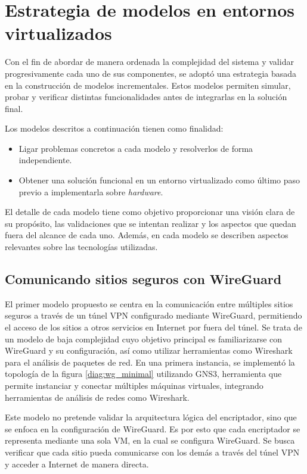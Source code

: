 \chapter{Estrategia de modelos en entornos virtualizados}

Con el fin de abordar de manera ordenada la complejidad del sistema y validar progresivamente cada uno de sus componentes, se adoptó una estrategia basada en la construcción de modelos incrementales. Estos modelos permiten simular, probar y verificar distintas funcionalidades antes de integrarlas en la solución final.

Los modelos descritos a continuación tienen como finalidad:
\begin{itemize}
    \item Ligar problemas concretos a cada modelo y resolverlos de forma independiente. %
    \item Obtener una solución funcional en un entorno virtualizado como último paso previo a implementarla sobre \textit{hardware}.
\end{itemize}

El detalle de cada modelo tiene como objetivo proporcionar una visión clara de su propósito, las validaciones que se intentan realizar y los aspectos que quedan fuera del alcance de cada uno. Además, en cada modelo se describen aspectos relevantes sobre las tecnologías utilizadas.

\section{Comunicando sitios seguros con WireGuard}
El primer modelo propuesto se centra en la comunicación entre múltiples sitios seguros a través de un túnel VPN configurado mediante WireGuard, permitiendo el acceso de los sitios a otros servicios en Internet por fuera del túnel. Se trata de un modelo de baja complejidad cuyo objetivo principal es familiarizarse con WireGuard y su configuración, así como utilizar herramientas como Wireshark para el análisis de paquetes de red. En una primera instancia, se implementó la topología de la figura \ref{diag:wg_minimal} utilizando GNS3, herramienta que permite instanciar y conectar múltiples máquinas virtuales, integrando herramientas de análisis de redes como Wireshark. 

Este modelo no pretende validar la arquitectura lógica del encriptador, sino que se enfoca en la configuración de WireGuard. Es por esto que cada encriptador se representa mediante una sola VM, en la cual se configura WireGuard. Se busca verificar que cada sitio pueda comunicarse con los demás a través del túnel VPN y acceder a Internet de manera directa.

